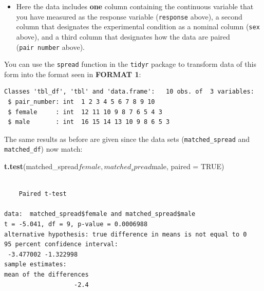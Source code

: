 \documentclass[twoside, 12pt]{article}
\newenvironment{Shaded}{\begin{snugshade}}{\end{snugshade}}
\newcommand{\KeywordTok}[1]{\textcolor[rgb]{0.13,0.29,0.53}{\textbf{{#1}}}}
\newcommand{\DataTypeTok}[1]{\textcolor[rgb]{0.13,0.29,0.53}{{#1}}}
\newcommand{\StringTok}[1]{\textcolor[rgb]{0.31,0.60,0.02}{{#1}}}
\newcommand{\OtherTok}[1]{\textcolor[rgb]{0.56,0.35,0.01}{{#1}}}
\newcommand{\NormalTok}[1]{{#1}}
\providecommand{\tightlist}{%
  \setlength{\itemsep}{0pt}\setlength{\parskip}{0pt}}
\begin{document}
\begin{itemize}
\tightlist
\item
  Here the data includes \textbf{one} column containing the continuous
  variable that you have measured as the response variable
  (\texttt{response} above), a second column that designates the
  experimental condition as a nominal column (\texttt{sex} above), and a
  third column that designates how the data are paired
  (\texttt{pair\ number} above).
\end{itemize}

You can use the \texttt{spread} function in the \texttt{tidyr} package
to transform data of this form into the format seen in \textbf{FORMAT
1}:

\begin{Shaded}
\end{Shaded}

\begin{Verbatim}[frame=single]
Classes 'tbl_df', 'tbl' and 'data.frame':   10 obs. of  3 variables:
 $ pair_number: int  1 2 3 4 5 6 7 8 9 10
 $ female     : int  12 11 10 9 8 7 6 5 4 3
 $ male       : int  16 15 14 13 10 9 8 6 5 3
\end{Verbatim}

The same results as before are given since the data sets
(\texttt{matched\_spread} and \texttt{matched\_df}) now match:

\begin{Shaded}
\begin{Highlighting}[]
\KeywordTok{t.test}\NormalTok{(matched_spread$female, matched_spread$male, }\DataTypeTok{paired =} \OtherTok{TRUE}\NormalTok{)}
\end{Highlighting}
\end{Shaded}

\begin{Verbatim}[frame=single]

    Paired t-test

data:  matched_spread$female and matched_spread$male
t = -5.041, df = 9, p-value = 0.0006988
alternative hypothesis: true difference in means is not equal to 0
95 percent confidence interval:
 -3.477002 -1.322998
sample estimates:
mean of the differences 
                   -2.4 
\end{Verbatim}
\end{document}
